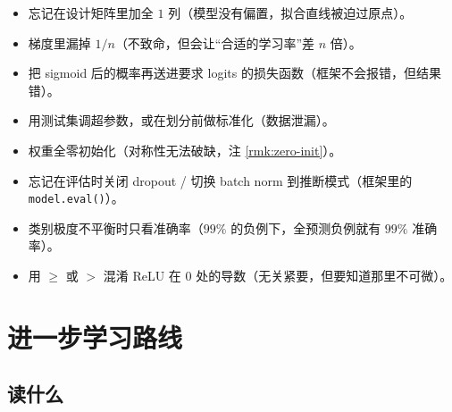 \documentclass[UTF8,a4paper,11pt]{ctexart}
\theoremstyle{definition}
\theoremstyle{plain}
\theoremstyle{remark}
\begin{document}
\begin{itemize}
  \item 忘记在设计矩阵里加全 $1$ 列（模型没有偏置，拟合直线被迫过原点）。
  \item 梯度里漏掉 $1/n$（不致命，但会让“合适的学习率”差 $n$ 倍）。
  \item 把 sigmoid 后的概率再送进要求 logits 的损失函数（框架不会报错，但结果错）。
  \item 用测试集调超参数，或在划分前做标准化（数据泄漏）。
  \item 权重全零初始化（对称性无法破缺，注 \ref{rmk:zero-init}）。
  \item 忘记在评估时关闭 dropout / 切换 batch norm 到推断模式（框架里的 \texttt{model.eval()}）。
  \item 类别极度不平衡时只看准确率（$99\%$ 的负例下，全预测负例就有 $99\%$ 准确率）。
  \item 用 $\ge$ 或 $>$ 混淆 ReLU 在 $0$ 处的导数（无关紧要，但要知道那里不可微）。
\end{itemize}

\section{进一步学习路线}\label{sec:roadmap}

\subsection{读什么}
\end{document}
